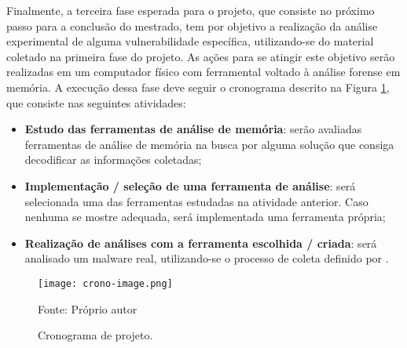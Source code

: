 Finalmente, a terceira fase esperada para o projeto, que consiste no próximo passo para a conclusão do mestrado, tem por objetivo a realização da análise experimental de alguma vulnerabilidade específica, utilizando-se do material coletado na primeira fase do projeto.
%
As ações para se atingir este objetivo serão realizadas em um computador físico com ferramental voltado à análise forense em memória.
%
A execução dessa fase deve seguir o cronograma descrito na Figura \ref{fig:cronograma}, que consiste nas seguintes atividades:


\begin{itemize}
 \item \textbf{Estudo das ferramentas de análise de memória}: serão avaliadas ferramentas de análise de memória na busca por alguma solução que consiga decodificar as informações coletadas;
 \item \textbf{Implementação / seleção de uma ferramenta de análise}: será selecionada uma das ferramentas estudadas na atividade anterior. Caso nenhuma se mostre adequada, será implementada uma ferramenta própria;
 \item \textbf{Realização de análises com a ferramenta escolhida / criada}: será analisado um malware real, utilizando-se o processo de coleta definido por \fancyname.
\end{itemize}

\begin{figure}[htb!]
\footnotesize
\caption{Cronograma de projeto.} %
\texttt{[image: crono-image.png]}
\centering
\label{fig:cronograma}
\begin{center}
Fonte: Próprio autor 
\end{center}
\end{figure}

%

